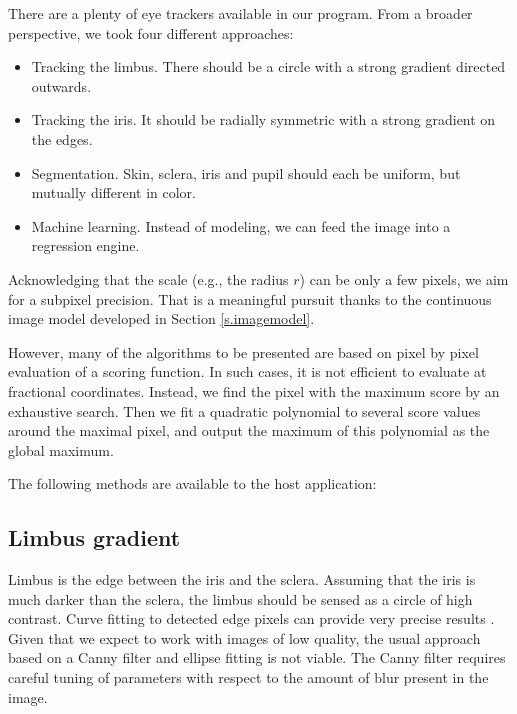 
There are a plenty of eye trackers available in our program.
From a broader perspective, we took four different approaches:
\begin{itemize}
\item Tracking the limbus. There should be a circle with a strong gradient directed outwards.
\item Tracking the iris. It should be radially symmetric with a strong gradient on the edges.
\item Segmentation. Skin, sclera, iris and pupil should each be uniform, but mutually different in color.
\item Machine learning. Instead of modeling, we can feed the image into a regression engine.
\end{itemize}

Acknowledging that the scale (e.g., the radius $r$) can be only a few pixels, we aim for a subpixel precision.
That is a meaningful pursuit thanks to the continuous image model developed in Section \ref{s.imagemodel}.

However, many of the algorithms to be presented are based on pixel by pixel evaluation of a scoring function.
In such cases, it is not efficient to evaluate at fractional coordinates.
Instead, we find the pixel with the maximum score by an exhaustive search.
Then we fit a quadratic polynomial to several score values around the maximal pixel, and output the maximum of this polynomial as the global maximum.

The following methods are available to the host application:

\subsection{Limbus gradient}
Limbus is the edge between the iris and the sclera.
Assuming that the iris is much darker than the sclera, the limbus should be sensed as a circle of high contrast.
Curve fitting to detected edge pixels can provide very precise results \cite{kassner14}.
Given that we expect to work with images of low quality, the usual approach based on a Canny filter and ellipse fitting is not viable.
The Canny filter requires careful tuning of parameters with respect to the amount of blur present in the image.

